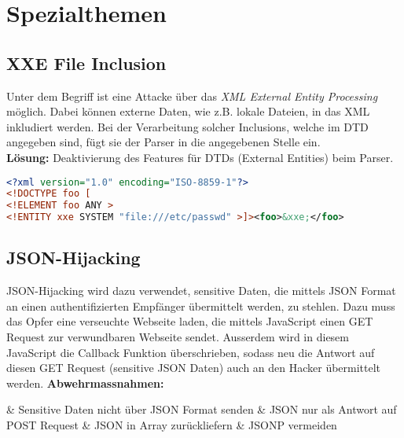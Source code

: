 \section{Spezialthemen}


\subsection{XXE File Inclusion}
Unter dem Begriff ist eine Attacke über das \textit{XML External Entity Processing} möglich. Dabei können externe Daten, wie z.B. lokale Dateien, in das XML inkludiert werden. Bei der Verarbeitung solcher Inclusions, welche im DTD angegeben sind, fügt sie der Parser in die angegebenen Stelle ein.\\

\textbf{Lösung:} Deaktivierung des Features für DTDs (External Entities) beim Parser.

\begin{lstlisting}[language=XML, caption=Beispiel der XXE]
<?xml version="1.0" encoding="ISO-8859-1"?>
<!DOCTYPE foo [  
<!ELEMENT foo ANY >
<!ENTITY xxe SYSTEM "file:///etc/passwd" >]><foo>&xxe;</foo>
\end{lstlisting}

\subsection{JSON-Hijacking}
JSON-Hijacking wird dazu verwendet, sensitive Daten, die mittels JSON Format an einen authentifizierten Empfänger übermittelt werden, zu stehlen. Dazu muss das Opfer eine verseuchte Webseite laden, die mittels JavaScript einen GET Request zur verwundbaren Webseite sendet. Ausserdem wird in diesem JavaScript die Callback Funktion überschrieben, sodass neu die Antwort auf diesen GET Request (sensitive JSON Daten) auch an den Hacker übermittelt werden.
\textbf{Abwehrmassnahmen:}
\begin{easylist}
	& Sensitive Daten nicht über JSON Format senden
	& JSON nur als Antwort auf POST Request
	& JSON in Array zurückliefern
	& JSONP vermeiden
\end{easylist}


